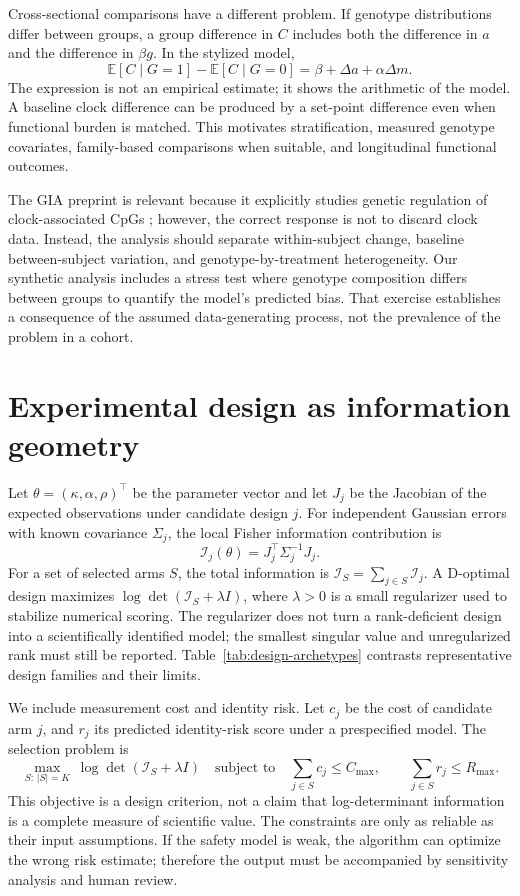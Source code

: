\documentclass[10pt,a4paper]{article}
\begin{document}
Cross-sectional comparisons have a different problem. If genotype distributions differ between groups, a group difference in \(C\) includes both the difference in \(a\) and the difference in \(\beta g\). In the stylized model,
\[
\mathbb{E}[C\mid G=1]-\mathbb{E}[C\mid G=0]
=\beta+\Delta a+\alpha\Delta m.
\]
The expression is not an empirical estimate; it shows the arithmetic of the model. A baseline clock difference can be produced by a set-point difference even when functional burden is matched. This motivates stratification, measured genotype covariates, family-based comparisons when suitable, and longitudinal functional outcomes.

The GIA preprint is relevant because it explicitly studies genetic regulation of clock-associated CpGs \citep{lim2026}; however, the correct response is not to discard clock data. Instead, the analysis should separate within-subject change, baseline between-subject variation, and genotype-by-treatment heterogeneity. Our synthetic analysis includes a stress test where genotype composition differs between groups to quantify the model's predicted bias. That exercise establishes a consequence of the assumed data-generating process, not the prevalence of the problem in a cohort.

\section{Experimental design as information geometry}
Let \(\theta=(\kappa,\alpha,\rho)^\top\) be the parameter vector and let \(J_j\) be the Jacobian of the expected observations under candidate design \(j\). For independent Gaussian errors with known covariance \(\Sigma_j\), the local Fisher information contribution is
\[
\mathcal{I}_j(\theta)=J_j^\top\Sigma_j^{-1}J_j.
\]
For a set of selected arms \(S\), the total information is \(\mathcal{I}_S=\sum_{j\in S}\mathcal{I}_j\). A D-optimal design maximizes \(\log\det(\mathcal{I}_S+\lambda I)\), where \(\lambda>0\) is a small regularizer used to stabilize numerical scoring. The regularizer does not turn a rank-deficient design into a scientifically identified model; the smallest singular value and unregularized rank must still be reported. Table~\ref{tab:design-archetypes} contrasts representative design families and their limits.

We include measurement cost and identity risk. Let \(c_j\) be the cost of candidate arm \(j\), and \(r_j\) its predicted identity-risk score under a prespecified model. The selection problem is
\[
\max_{S:\,|S|=K}\ \log\det(\mathcal{I}_S+\lambda I)
\quad\text{subject to}\quad
\sum_{j\in S}c_j\le C_{\max},\qquad
\sum_{j\in S}r_j\le R_{\max}.
\]
This objective is a design criterion, not a claim that log-determinant information is a complete measure of scientific value. The constraints are only as reliable as their input assumptions. If the safety model is weak, the algorithm can optimize the wrong risk estimate; therefore the output must be accompanied by sensitivity analysis and human review.
\end{document}
